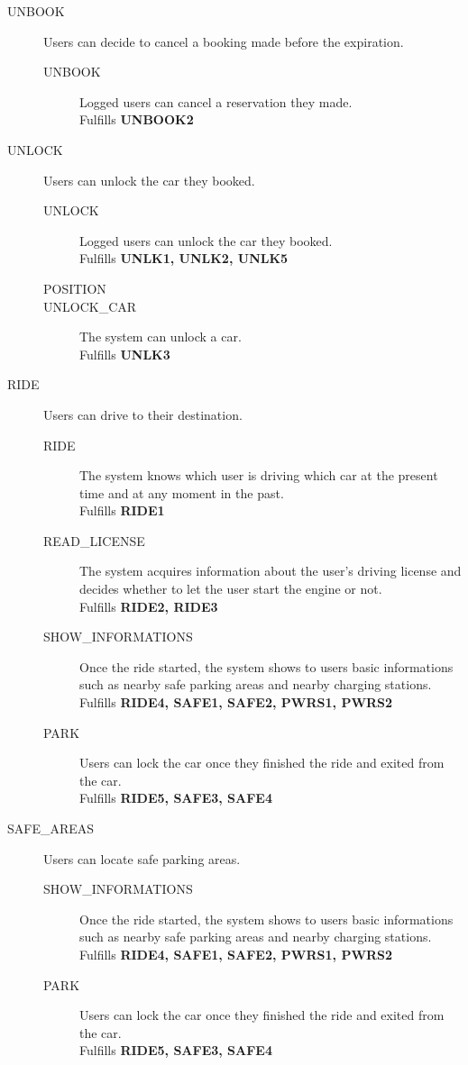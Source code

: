 \documentclass[11pt]{article} %
\begin{document}
\begin{description}
	\item[UNBOOK] Users can decide to cancel a booking made before the expiration.\hfill {\color{red}{Missing UNBOOK1}}
		\begin{description}
			\item[UNBOOK] Logged users can cancel a reservation they made. \\ Fulfills \textbf{UNBOOK2}
		\end{description}

	\item[UNLOCK] Users can unlock the car they booked. \hfill {\color{red}{Missing UNLK4}}
		\begin{description}
			\item[UNLOCK] Logged users can unlock the car they booked. \\ Fulfills \textbf{UNLK1, UNLK2, UNLK5}
			\item[POSITION] {\color{red}{ The system must be able to locate the user. }}
			\item[UNLOCK\_CAR] The system can unlock a car. \\ Fulfills \textbf{UNLK3}
		\end{description}

	\item[RIDE] Users can drive to their destination. \hfill  {\color{red}{change RIDE def. Add PARK}}
		\begin{description}
			\item[RIDE] The system knows which user is driving which car at the present time and at any moment in the past. \\ Fulfills \textbf{RIDE1}
			\item[READ\_LICENSE] The system acquires information about the user's driving license and decides whether to let the user start the engine or not. \\ Fulfills \textbf{RIDE2, RIDE3}
			\item[SHOW\_INFORMATIONS] Once the ride started, the system shows to users basic informations such as nearby safe parking areas and nearby charging stations. \\ Fulfills \textbf{RIDE4, SAFE1, SAFE2, PWRS1, PWRS2}
			\item[PARK] Users can lock the car once they finished the ride and exited from the car. \\ Fulfills \textbf{RIDE5, SAFE3, SAFE4}
		\end{description}

	\item[SAFE\_AREAS] Users can locate safe parking areas. \hfill   {\color{red}{Overlaps with RIDE!}}
		\begin{description}
			\item[SHOW\_INFORMATIONS] Once the ride started, the system shows to users basic informations such as nearby safe parking areas and nearby charging stations. \\ Fulfills \textbf{RIDE4, SAFE1, SAFE2, PWRS1, PWRS2}
			\item[PARK] Users can lock the car once they finished the ride and exited from the car. \\ Fulfills \textbf{RIDE5, SAFE3, SAFE4}
		\end{description}


\end{description}
\end{document}
